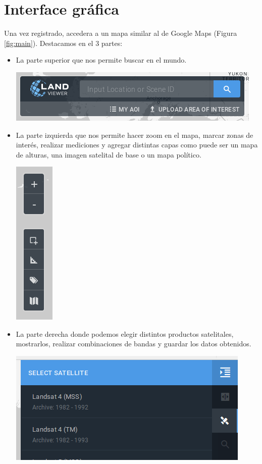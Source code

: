 \documentclass[a4paper,12pt]{book}
\begin{document}
\section{Interface gráfica}

Una vez registrado, accedera a un mapa  similar al de Google Maps (Figura \ref{fig:main}). Destacamos en el 3 partes:

\begin{itemize}
    \item La parte superior que nos permite buscar en el mundo.
     \begin{center}\includegraphics[scale=0.4]{in:search.png}\end{center}
    \item La parte izquierda que nos permite hacer zoom en el mapa, marcar zonas de interés, realizar mediciones y agregar distintas capas como puede ser un mapa de alturas, una imagen satelital de base o un mapa político.
     \begin{center}\includegraphics[scale=0.4]{in:edit.png}\end{center}
    \item La parte derecha donde podemos elegir distintos productos satelitales, mostrarlos, realizar combinaciones de bandas y guardar los datos obtenidos.
     \begin{center}\includegraphics[scale=0.4]{in:sat.png}\end{center}
\end{itemize}
\end{document}
